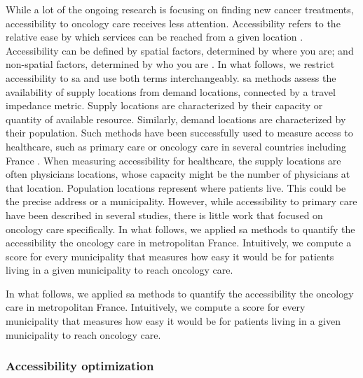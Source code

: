 While a lot of the ongoing research is focusing on finding new cancer
treatments, accessibility to oncology care receives less attention.
Accessibility refers to the relative ease by which services can be reached from
a given location \cite{wang_measurement_2012}. Accessibility can be defined by
spatial factors, determined by where you are; and non-spatial factors,
determined by who you are \cite{khan_integrated_1992}. In what follows, we
restrict accessibility to \acf{sa} and use both terms interchangeably. \ac{sa}
methods assess the availability of supply locations from demand locations,
connected by a travel impedance metric. Supply locations are characterized by
their capacity or quantity of available resource. Similarly, demand locations
are characterized by their population. Such methods have been successfully used
to measure access to healthcare, such as primary care
\cite{guagliardo_spatial_2004} or oncology care
\cite{wang_measurement_2012,zahnd_spatial_2021,alahmadi_spatial_2013} in several
countries including France
\cite{launay_methodology_2019,gusmano_disparities_2014,gao_assessment_2016}.
When measuring accessibility for healthcare, the supply locations are often
physicians locations, whose capacity might be the number of physicians at that
location. Population locations represent where patients live. This could be
the precise address or a municipality. However, while accessibility to primary
care have been described in several studies, there is little work that focused
on oncology care specifically. In what follows, we applied \ac{sa} methods to
quantify the accessibility the oncology care in metropolitan France.
Intuitively, we compute a score for every municipality that measures how easy
it would be for patients living in a given municipality to reach oncology care.

In what follows, we applied \ac{sa} methods to
quantify the accessibility the oncology care in metropolitan France.
Intuitively, we compute a score for every municipality that measures how easy it
would be for patients living in a given municipality to reach oncology care.

\subsubsection{Accessibility optimization}

